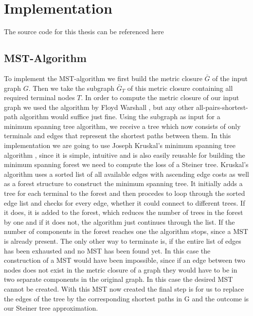 
\chapter{Implementation}\label{chapter:implementation}

The source code for this thesis can be referenced here \cite{githublink}

\section{MST-Algorithm}

To implement the MST-algorithm we first build the metric closure $\bar{G}$ of the input graph $G$. Then we take the subgraph $\bar{G}_T$ of this metric closure containing all required terminal nodes $T$. In order to compute the metric closure of our input graph we used the algorithm by Floyd Warshall \cite{hougardy2010floyd}, but any other all-pairs-shortest-path algorithm would suffice just fine. Using the subgraph as input for a minimum spanning tree algorithm, we receive a tree which now consists of only terminals and edges that represent the shortest paths between them. In this implementation we are going to use Joseph Kruskal's minimum spanning tree algorithm \cite{kruskal1956shortest}, since it is simple, intuitive and is also easily reusable for building the minimum spanning forest we need to compute the loss of a Steiner tree. Kruskal's algorithm uses a sorted list of all available edges with ascending edge costs as well as a forest structure to construct the minimum spanning tree. It initially adds a tree for each terminal to the forest and then procedes to loop through the sorted edge list and checks for every edge, whether it could connect to different trees. If it does, it is added to the forest, which reduces the number of trees in the forest by one and if it does not, the algorithm just continues through the list. If the number of components in the forest reaches one the algorithm stops, since a MST is already present. The only other way to terminate is, if the entire list of edges has been exhausted and no MST has been found yet. In this case the construction of a MST would have been impossible, since if an edge between two nodes does not exist in the metric closure of a graph they would have to be in two separate components in the original graph. In this case the desired MST cannot be created. With this MST now created the final step is for us to replace the edges of the tree by the corresponding shortest paths in G and the outcome is our Steiner tree approximation.

